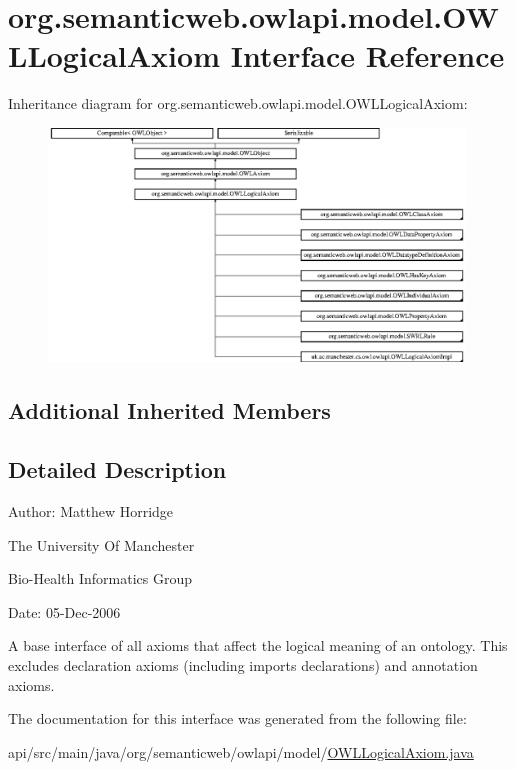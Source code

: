 \hypertarget{interfaceorg_1_1semanticweb_1_1owlapi_1_1model_1_1_o_w_l_logical_axiom}{\section{org.\-semanticweb.\-owlapi.\-model.\-O\-W\-L\-Logical\-Axiom Interface Reference}
\label{interfaceorg_1_1semanticweb_1_1owlapi_1_1model_1_1_o_w_l_logical_axiom}
}
Inheritance diagram for org.\-semanticweb.\-owlapi.\-model.\-O\-W\-L\-Logical\-Axiom\-:\begin{figure}[H]
\begin{center}
\leavevmode
\includegraphics[height=6.204986cm]{interfaceorg_1_1semanticweb_1_1owlapi_1_1model_1_1_o_w_l_logical_axiom}
\end{center}
\end{figure}
\subsection*{Additional Inherited Members}


\subsection{Detailed Description}
Author\-: Matthew Horridge\par
 The University Of Manchester\par
 Bio-\/\-Health Informatics Group\par
 Date\-: 05-\/\-Dec-\/2006\par
\par


A base interface of all axioms that affect the logical meaning of an ontology. This excludes declaration axioms (including imports declarations) and annotation axioms. 

The documentation for this interface was generated from the following file\-:\begin{DoxyCompactItemize}
\item 
api/src/main/java/org/semanticweb/owlapi/model/\hyperlink{_o_w_l_logical_axiom_8java}{O\-W\-L\-Logical\-Axiom.\-java}\end{DoxyCompactItemize}
